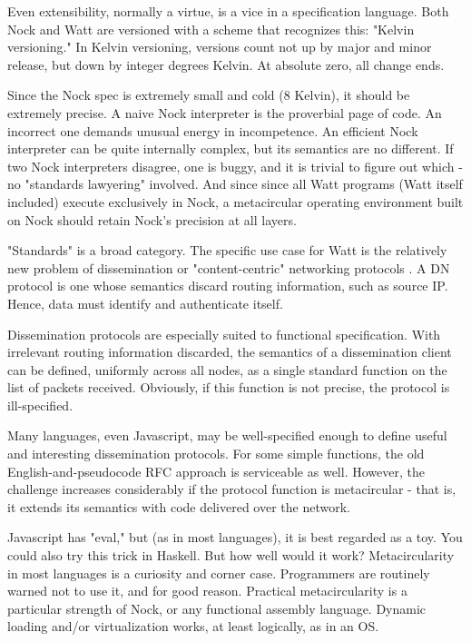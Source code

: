 \documentclass[10pt, nocopyrightspace]{sigplanconf}
\begin{document}
Even extensibility, normally a virtue, is a vice in a
specification language.  Both Nock and Watt are versioned with a
scheme that recognizes this: "Kelvin versioning."  In Kelvin
versioning, versions count not up by major and minor release, but
down by integer degrees Kelvin.  At absolute zero, all change ends.

Since the Nock spec is extremely small and cold (8 Kelvin), it
should be extremely precise.  A naive Nock interpreter is the
proverbial page of code.  An incorrect one demands unusual energy
in incompetence.  An efficient Nock interpreter can be quite
internally complex, but its semantics are no different.  If two
Nock interpreters disagree, one is buggy, and it is trivial to
figure out which - no "standards lawyering" involved.  And since
since all Watt programs (Watt itself included) execute
exclusively in Nock, a metacircular operating environment built
on Nock should retain Nock's precision at all layers.

"Standards" is a broad category.  The specific use case for Watt
is the relatively new problem of dissemination or
"content-centric" networking protocols \citep{namedcontent}.  A DN protocol is one
whose semantics discard routing information, such as source IP.
Hence, data must identify and authenticate itself.

Dissemination protocols are especially suited to functional
specification.  With irrelevant routing information discarded,
the semantics of a dissemination client can be defined, uniformly
across all nodes, as a single standard function on the list of
packets received.  Obviously, if this function is not precise,
the protocol is ill-specified.

Many languages, even Javascript, may be well-specified enough to
define useful and interesting dissemination protocols.  For some
simple functions, the old English-and-pseudocode RFC approach is
serviceable as well.  However, the  challenge increases
considerably if the protocol function is metacircular - that is,
it extends its semantics with code delivered over the network.

Javascript has "eval," but (as in most languages), it is best
regarded as a toy.  You could also try this trick in Haskell.
But how well would it work?  Metacircularity in most languages is
a curiosity and corner case.  Programmers are routinely warned
not to use it, and for good reason.  Practical 
metacircularity is a particular strength of Nock, or any
functional assembly language.  Dynamic loading and/or
virtualization works, at least logically, as in an OS. 
\end{document}
